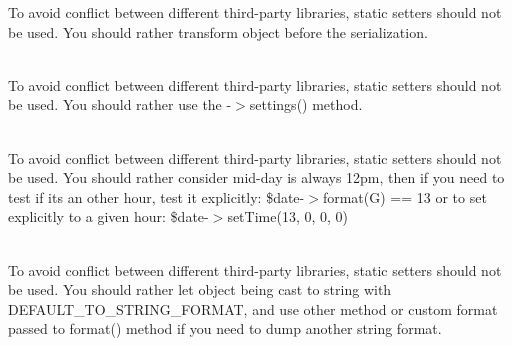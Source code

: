 \begin{DoxyRefList}
\label{deprecated__deprecated000198}%
%
To avoid conflict between different third-\/party libraries, static setters should not be used. You should rather transform  object before the serialization. 
\item[Global \doxylink{interface_carbon_1_1_carbon_interface_ae0277538190ea62f8a7fdc93b0190639}{Carbon\+Interface\+::set\+Human\+Diff\+Options} (int \$human\+Diff\+Options)]\hfill \\
\label{deprecated__deprecated000199}%
%
To avoid conflict between different third-\/party libraries, static setters should not be used. You should rather use the -\/\texorpdfstring{$>$}{>}settings() method.  
\item[Global \doxylink{interface_carbon_1_1_carbon_interface_a492cccea16f79a9ea5e0c9c380af49f8}{Carbon\+Interface\+::set\+Mid\+Day\+At} (\$hour)]\hfill \\
\label{deprecated__deprecated000200}%
%
To avoid conflict between different third-\/party libraries, static setters should not be used. You should rather consider mid-\/day is always 12pm, then if you need to test if it\textquotesingle{}s an other hour, test it explicitly\+: \$date-\/\texorpdfstring{$>$}{>}format(\textquotesingle{}G\textquotesingle{}) == 13 or to set explicitly to a given hour\+: \$date-\/\texorpdfstring{$>$}{>}set\+Time(13, 0, 0, 0) 
\item[Global \doxylink{interface_carbon_1_1_carbon_interface_a240e700a571daf0b97f611a176eed486}{Carbon\+Interface\+::set\+To\+String\+Format} (Closure\texorpdfstring{$\vert$}{|}string\texorpdfstring{$\vert$}{|}null \$format)]\hfill \\
\label{deprecated__deprecated000201}%
%
To avoid conflict between different third-\/party libraries, static setters should not be used. You should rather let  object being cast to string with DEFAULT\+\_\+\+TO\+\_\+\+STRING\+\_\+\+FORMAT, and use other method or custom format passed to format() method if you need to dump another string format. 
\item[Global \doxylink{interface_carbon_1_1_carbon_interface_a0390d4fc8f0f128df9d9bff1edf7f829}{Carbon\+Interface\+::set\+Weekend\+Days} (array \$days)]\hfill \\
\label{deprecated__deprecated000202}%
%

\end{DoxyRefList}
